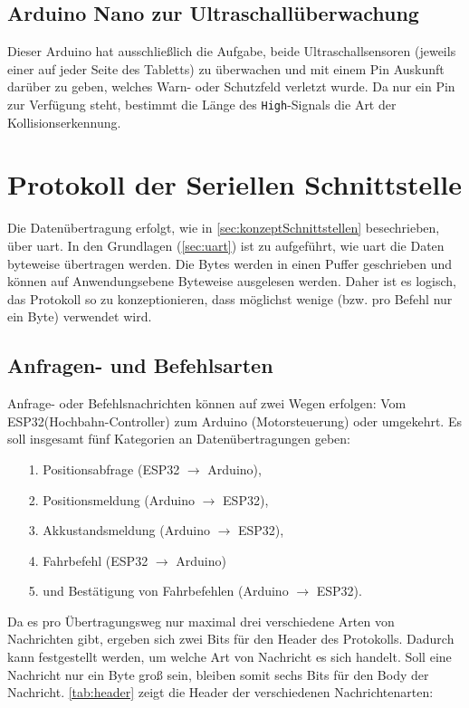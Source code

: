 \subsection{Arduino Nano zur Ultraschallüberwachung} 
\label{sec:aufgabeArduinoNanoUltraschall}
Dieser Arduino hat ausschließlich die Aufgabe, beide Ultraschallsensoren (jeweils einer auf jeder Seite des Tabletts) zu überwachen und mit einem Pin Auskunft darüber zu geben, welches Warn- oder Schutzfeld verletzt wurde. Da nur ein Pin zur Verfügung steht, bestimmt die Länge des \texttt{High}-Signals die Art der Kollisionserkennung.
\newpage
\section{Protokoll der Seriellen Schnittstelle}
Die Datenübertragung erfolgt, wie in \autoref{sec:konzeptSchnittstellen} besechrieben, über \acrshort{uart}. In den Grundlagen (\autoref{sec:uart}) ist zu aufgeführt, wie \acrshort{uart} die Daten byteweise übertragen werden. Die Bytes werden in einen Puffer geschrieben und können auf Anwendungsebene Byteweise ausgelesen werden. Daher ist es logisch, das Protokoll so zu konzeptionieren, dass möglichst wenige (bzw. pro Befehl nur ein Byte) verwendet wird. 

\subsection{Anfragen- und Befehlsarten}
Anfrage- oder Befehlsnachrichten können auf zwei Wegen erfolgen: Vom ESP32(Hochbahn-Controller) zum Arduino (Motorsteuerung) oder umgekehrt. Es soll insgesamt fünf Kategorien an Datenübertragungen geben:

\begin{itemize}
	\item [1.] Positionsabfrage (ESP32 $\rightarrow$ Arduino),
	\item [2.] Positionsmeldung (Arduino $\rightarrow$ ESP32),
	\item [3.] Akkustandsmeldung (Arduino $\rightarrow$ ESP32),
	\item [4.] Fahrbefehl (ESP32 $\rightarrow$ Arduino)
	\item [5.] und Bestätigung von Fahrbefehlen (Arduino $\rightarrow$ ESP32).
\end{itemize}

Da es pro Übertragungsweg nur maximal drei verschiedene Arten von Nachrichten gibt, ergeben sich zwei Bits für den Header des Protokolls. Dadurch kann festgestellt werden, um welche Art von Nachricht es sich handelt.
Soll eine Nachricht nur ein Byte groß sein, bleiben somit sechs Bits für den Body der Nachricht. 
\autoref{tab:header} zeigt die Header der verschiedenen Nachrichtenarten:

